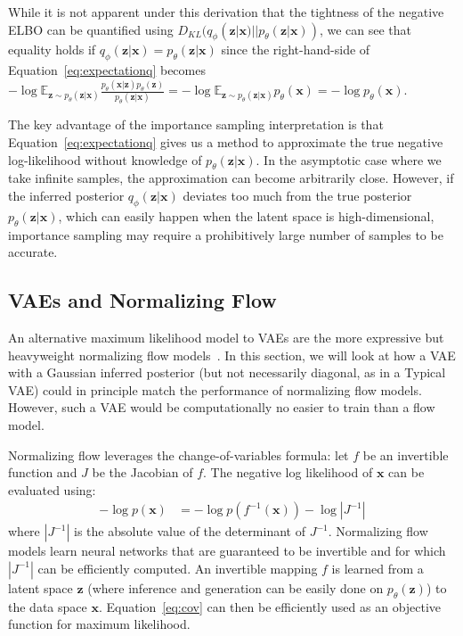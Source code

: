 \documentclass{article}
\begin{document}
While it is not apparent under this derivation that the tightness of the negative ELBO can be quantified using $D_{KL}(q_\phi(\mathbf{z}|\mathbf{x}) ||  p_\theta(\mathbf{z}|\mathbf{x}))$, we can see that equality holds if $q_\phi(\mathbf{z}|\mathbf{x}) = p_\theta(\mathbf{z}|\mathbf{x})$ since the right-hand-side of Equation~\ref{eq:expectationq} becomes $-\log \mathbb{E}_{\mathbf{z} \sim p_\theta(\mathbf{z}|\mathbf{x})} \frac{p_\theta(\mathbf{x}|\mathbf{z}) p_\theta(\mathbf{z})}{p_\theta(\mathbf{z}|\mathbf{x})} =  - \log \mathbb{E}_{\mathbf{z} \sim p_\theta(\mathbf{z}|\mathbf{x})} p_\theta(\mathbf{x}) = - \log  p_\theta(\mathbf{x}) $.

The key advantage of the importance sampling interpretation is that Equation~\ref{eq:expectationq} gives us a method to approximate the true negative log-likelihood without knowledge of $p_\theta(\mathbf{z}|\mathbf{x})$. In the asymptotic case where we take infinite samples, the approximation can become arbitrarily close. 
However, if the inferred posterior $q_\phi(\mathbf{z}|\mathbf{x})$ deviates too much from the true posterior $p_\theta(\mathbf{z}|\mathbf{x})$, which can easily happen when the latent space is high-dimensional, importance sampling may require a prohibitively large number of samples to be accurate.

\subsection{VAEs and Normalizing Flow}
\label{sec:flow}
An alternative maximum likelihood model to VAEs are the more expressive but heavyweight normalizing flow models~\cite{nice}.
In this section, we will look at how a VAE with a Gaussian inferred posterior (but not necessarily diagonal, as in a Typical VAE) could in principle match the performance of normalizing flow models.
However, such a VAE would be computationally no easier to train than a flow model. 

Normalizing flow leverages the change-of-variables formula: let $f$ be an invertible function and $J$ be the Jacobian of $f$. The negative log likelihood of $\mathbf{x}$ can be evaluated using:
\begin{align}
    -\log p(\mathbf{x}) &= -\log p(f^{-1}(\mathbf{x})) - \log |J^{-1}| \label{eq:cov}
\end{align}
where $|J^{-1}|$ is the absolute value of the determinant of $J^{-1}$.
Normalizing flow models learn neural networks that are guaranteed to be invertible and for which $|J^{-1}|$ can be efficiently computed. An invertible mapping $f$ is learned  from a latent space $\mathbf{z}$ (where inference and generation can be easily done on $p_\theta(\mathbf{z})$) to the data space $\mathbf{x}$.
 Equation~\ref{eq:cov} can then be efficiently used as an objective function for maximum likelihood. 
\end{document}
